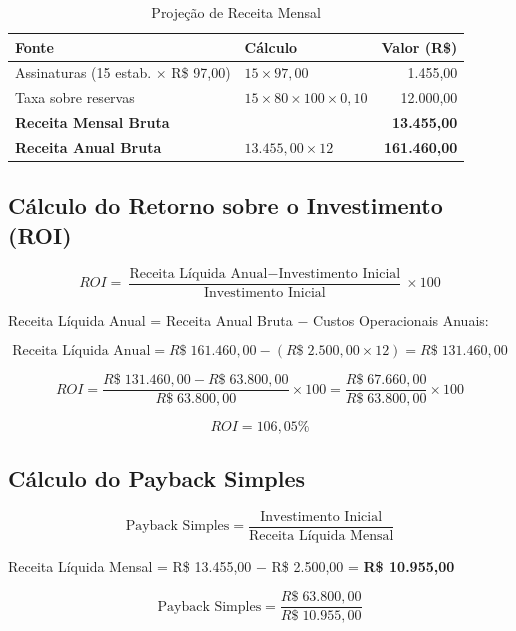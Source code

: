 \documentclass[12pt,a4paper,oneside]{report}
\begin{document}
\begin{table}[htbp]
\centering
\caption{Projeção de Receita Mensal}
\begin{tabular}{p{6.5cm} p{4.5cm} r}
\toprule
\textbf{Fonte} & \textbf{Cálculo} & \textbf{Valor (R\$)} \\
\midrule
Assinaturas (15 estab. $\times$ R\$ 97,00) & $15 \times 97{,}00$ & 1.455,00 \\
Taxa sobre reservas & $15 \times 80 \times 100 \times 0{,}10$ & 12.000,00 \\
\midrule
\textbf{Receita Mensal Bruta} & & \textbf{13.455,00} \\
\textbf{Receita Anual Bruta} & $13.455{,}00 \times 12$ & \textbf{161.460,00} \\
\bottomrule
\end{tabular}
\end{table}

\subsection{Cálculo do Retorno sobre o Investimento (ROI)}

\begin{equation}
ROI = \frac{\text{Receita Líquida Anual} - \text{Investimento Inicial}}{\text{Investimento Inicial}} \times 100
\end{equation}

Receita Líquida Anual = Receita Anual Bruta $-$ Custos Operacionais Anuais:

$$\text{Receita Líquida Anual} = R\$ \; 161.460{,}00 - (R\$ \; 2.500{,}00 \times 12) = R\$ \; 131.460{,}00$$

$$ROI = \frac{R\$ \; 131.460{,}00 - R\$ \; 63.800{,}00}{R\$ \; 63.800{,}00} \times 100 = \frac{R\$ \; 67.660{,}00}{R\$ \; 63.800{,}00} \times 100$$

$$\boxed{ROI = 106{,}05\%}$$

\subsection{Cálculo do Payback Simples}

\begin{equation}
\text{Payback Simples} = \frac{\text{Investimento Inicial}}{\text{Receita Líquida Mensal}}
\end{equation}

Receita Líquida Mensal = R\$ 13.455,00 $-$ R\$ 2.500,00 = \textbf{R\$ 10.955,00}

$$\text{Payback Simples} = \frac{R\$ \; 63.800{,}00}{R\$ \; 10.955{,}00}$$
\end{document}
